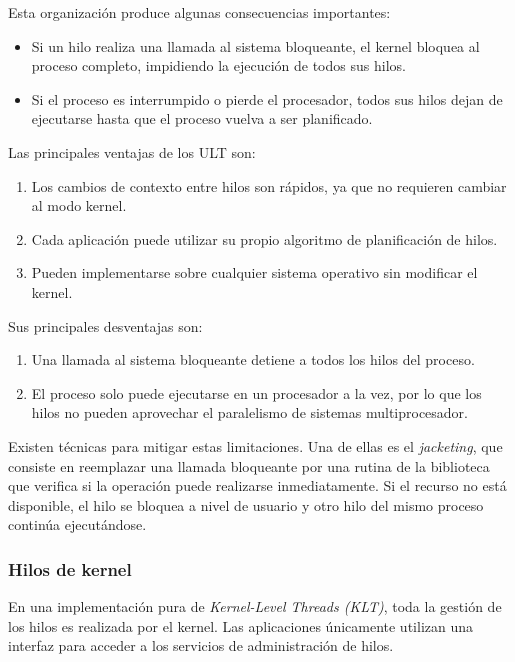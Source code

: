 Esta organización produce algunas consecuencias importantes:
\begin{itemize}
  \item Si un hilo realiza una llamada al sistema bloqueante, el kernel bloquea al proceso completo, impidiendo la ejecución de todos sus hilos.
  \item Si el proceso es interrumpido o pierde el procesador, todos sus hilos dejan de ejecutarse hasta que el proceso vuelva a ser planificado.
\end{itemize}
Las principales ventajas de los ULT son:
\begin{enumerate}
  \item Los cambios de contexto entre hilos son rápidos, ya que no requieren cambiar al modo kernel.
  \item Cada aplicación puede utilizar su propio algoritmo de planificación de hilos.
  \item Pueden implementarse sobre cualquier sistema operativo sin modificar el kernel.
\end{enumerate}
Sus principales desventajas son:
\begin{enumerate}
  \item Una llamada al sistema bloqueante detiene a todos los hilos del proceso.
  \item El proceso solo puede ejecutarse en un procesador a la vez, por lo que los hilos no pueden aprovechar el paralelismo de sistemas multiprocesador.
\end{enumerate}

Existen técnicas para mitigar estas limitaciones. Una de ellas es el \textit{jacketing}, que consiste en reemplazar una llamada bloqueante por una rutina de la biblioteca que verifica si la operación puede realizarse inmediatamente. Si el recurso no está disponible, el hilo se bloquea a nivel de usuario y otro hilo del mismo proceso continúa ejecutándose.

\subsubsection{Hilos de kernel}

En una implementación pura de \textit{Kernel-Level Threads (KLT)}, toda la gestión de los hilos es realizada por el kernel. Las aplicaciones únicamente utilizan una interfaz para acceder a los servicios de administración de hilos.

